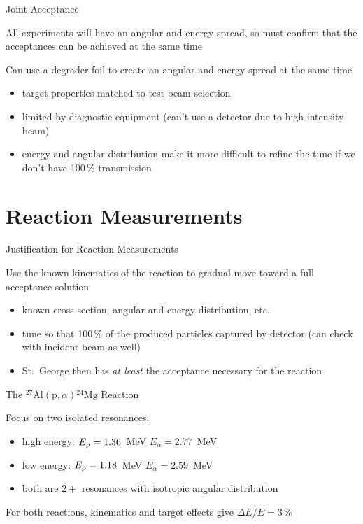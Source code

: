 \documentclass[10pt]{beamer}
\newcommand{\mnuc}[2]{{}^{#1}\textrm{#2}}
\newcommand{\react}[4]{$#1(#2,#3)#4$}
\newcommand{\alpa}{\react{\mnuc{27}{Al}}{\textrm{p}}{\alpha}{\mnuc{24}{Mg}}}
\begin{document}
\begin{frame}[fragile]{Joint Acceptance}

    All experiments will have an angular and energy spread, so must
    confirm that the acceptances can be achieved at the same time

    Can use a degrader foil to create an angular and energy spread at the same time
    \begin{itemize}
        \item target properties matched to test beam selection
        \item limited by diagnostic equipment (can't use a detector due to high-intensity beam)
        \item energy and angular distribution make it more difficult to refine the tune if we don't have 100\,\% transmission
    \end{itemize}

\end{frame}

\section{Reaction Measurements}

\begin{frame}[fragile]{Justification for Reaction Measurements}

    Use the known kinematics of the reaction to gradual move toward a full acceptance solution
    \begin{itemize}
        \item known cross section, angular and energy distribution, etc.
        \item tune so that 100\,\% of the produced particles captured by detector (can check with incident beam as well)
        \item St.\ George then has \textit{at least} the acceptance necessary for the reaction
    \end{itemize}

\end{frame}

\begin{frame}[fragile]{The \alpa{} Reaction}

    Focus on two isolated resonances:
    \begin{itemize}
        \item high energy: $E_{\rm p} = 1.36$~MeV \textrightarrow{} $E_{\alpha} = 2.77$~MeV
        \item low energy: $E_{\rm p} = 1.18$~MeV \textrightarrow{} $E_{\alpha} = 2.59$~MeV
        \item both are $2+$ resonances with isotropic angular distribution
    \end{itemize}

    For both reactions, kinematics and target effects give $\Delta E/E = 3$\,\%

\end{frame}
\end{document}
